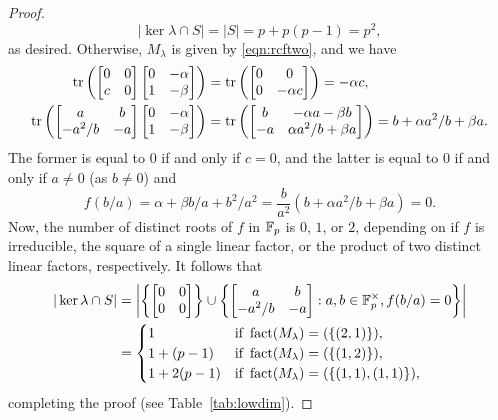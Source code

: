 \begin{proof}
\begin{equation*}
|\ker\lambda\cap S|=|S|=p+p(p-1)=p^2,
\end{equation*}
as desired. Otherwise, $M_\lambda$ is given by \eqref{eqn:rcftwo}, and we have
\begin{equation}
\label{eqn:linrels}
\begin{split}
\operatorname{tr}\left(
\begin{bmatrix}
0&0\\
c&0
\end{bmatrix}
\begin{bmatrix}
0&-\alpha\\
1&-\beta
\end{bmatrix}\right)
&=
\operatorname{tr}\left(
\begin{bmatrix}
0&0\\
0&-\alpha c
\end{bmatrix}\right)
=-\alpha c,\\
\operatorname{tr}\left(
\begin{bmatrix}
a&b\\
-a^2/b&-a
\end{bmatrix}
\begin{bmatrix}
0&-\alpha\\
1&-\beta
\end{bmatrix}\right)
&=
\operatorname{tr}\left(
\begin{bmatrix}
b&-\alpha a-\beta b\\
-a&\alpha a^2/b+\beta a
\end{bmatrix}\right)
=b+\alpha a^2/b+\beta a.
\end{split}
\end{equation}
The former is equal to $0$ if and only if $c=0$, and the latter is equal to $0$ if and only if $a\ne 0$ (as $b\ne 0$) and
\begin{equation*}
f(b/a)=\alpha+\beta b/a+b^2/a^2=\frac{b}{a^2}(b+\alpha a^2/b+\beta a)=0.
\end{equation*}
Now, the number of distinct roots of $f$ in $\mathbb{F}_p$ is $0$, $1$, or $2$, depending on if $f$ is irreducible, the square of a single linear factor, or the product of two distinct linear factors, respectively. It follows that
\begin{align*}
|\ker\lambda\cap S|&=\left|\left\{\begin{bmatrix}
0&0\\
0&0
\end{bmatrix}\right\}\cup
\left\{\begin{bmatrix}
a&b\\
-a^2/b&-a
\end{bmatrix}
:a,b\in\mathbb{F}_p^\times, f(b/a)=0\right\}\right|\\
&=\begin{cases}
1&\text{if }\operatorname{fact}(M_\lambda)=(\{(2,1)\}),\\
1+(p-1)&\text{if }\operatorname{fact}(M_\lambda)=(\{(1,2)\}),\\
1+2(p-1)&\text{if }\operatorname{fact}(M_\lambda)=(\{(1,1),(1,1)\}),
\end{cases}
\end{align*}
completing the proof (see Table~\ref{tab:lowdim}).
\end{proof}
